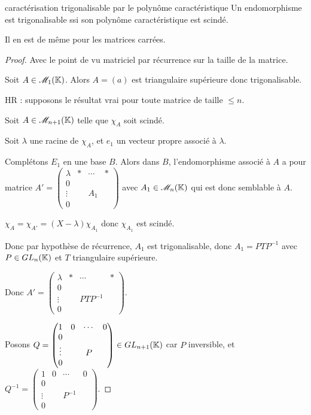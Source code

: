 \begin{theorement}{caractérisation trigonalisable par le polynôme caractéristique}{}
    Un endomorphisme est trigonalisable ssi son polynôme caractéristique est scindé. 

    Il en est de même pour les matrices carrées.
\end{theorement}


\begin{proof}
    Avec le point de vu matriciel par récurrence sur la taille de la matrice.

    Soit $A \in \mathscr M_1(\mathbb{K})$. Alors $A = (a)$ est triangulaire supérieure donc trigonalisable.

    HR : supposons le résultat vrai pour toute matrice de taille $\leqslant n$. 

    Soit $A \in \mathscr M_{n + 1}(\mathbb{K})$ telle que $\chi_A$ soit scindé.

    Soit $\lambda$ une racine de $\chi_A$, et $e_1$ un vecteur propre associé à $\lambda$.

    Complétons $E_1$ en une base $B$. Alors dans $B$, l'endomorphisme associé à $A$ a pour matrice 
    $A' = \begin{pmatrix}
        \lambda & * & \cdots & * \\
        0 & & & \\
        \vdots & & A_1 & \\
        0 & & &
    \end{pmatrix}$ avec $A_1 \in \mathscr M_n(\mathbb{K})$ qui est donc semblable à $A$. 

    $\chi_A = \chi_{A'} = (X - \lambda) \chi_{A_1}$ donc $\chi_{A_1}$ est scindé.

    Donc par hypothèse de récurrence, $A_1$ est trigonalisable, donc
    $A_1 = P T P^{-1}$ avec $P \in GL_n(\mathbb{K})$ et $T$ triangulaire supérieure.

    Donc $A' = \begin{pmatrix}
        \lambda & * & \cdots & * \\
        0 & & & \\
        \vdots & & P T P^{-1} & \\
        0 & & &
    \end{pmatrix}$.

    Posons $Q = \begin{pmatrix}
        1 & 0 & \cdots & 0 \\
        0 & & & \\
        \vdots & & P & \\
        0 & & &
    \end{pmatrix} \in GL_{n + 1}(\mathbb{K})$ car $P$ inversible, et 
    $Q^{-1} = \begin{pmatrix}
        1 & 0 & \cdots & 0 \\
        0 & & & \\
        \vdots & & P^{-1} & \\
        0 & & &
    \end{pmatrix}$.


\end{proof}
